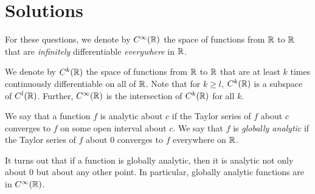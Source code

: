 \documentclass[10pt]{amsart}
\begin{document}
\section{Solutions}
For these questions, we denote by $C^\infty(\mathbb{R})$ the space of
functions from $\mathbb{R}$ to $\mathbb{R}$ that are {\em infinitely} differentiable
{\em everywhere} in $\mathbb{R}$.

We denote by $C^k(\mathbb{R})$ the space of functions from $\mathbb{R}$ to $\mathbb{R}$ that
are at least $k$ times continuously differentiable on all of
$\mathbb{R}$. Note that for $k \ge l$, $C^k(\mathbb{R})$ is a subspace of
$C^l(\mathbb{R})$. Further, $C^\infty(\mathbb{R})$ is the intersection of $C^k(\mathbb{R})$
for all $k$.

We say that a function $f$ is analytic about $c$ if the Taylor series
of $f$ about $c$ converges to $f$ on some open interval about $c$. We
say that $f$ is {\em globally analytic} if the Taylor series of $f$
about $0$ converges to $f$ everywhere on $\mathbb{R}$.

It turns out that if a function is globally analytic, then it is
analytic not only about $0$ but about any other point. In particular,
globally analytic functions are in $C^\infty(\mathbb{R})$.
\end{document}
